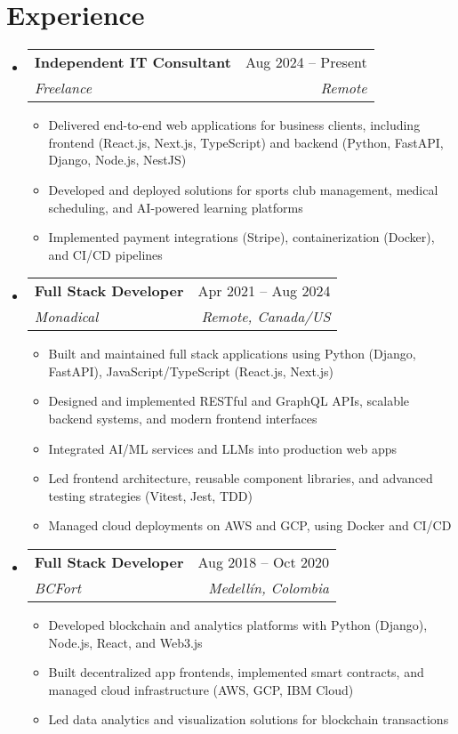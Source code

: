 \documentclass[letterpaper,11pt]{article}
\makeatletter
\newcommand{\resumeSubheading}[4]{
  \vspace{-2pt}
  \item[]
  \begin{tabular*}{\textwidth}{@{\extracolsep{\fill}}l r}
    \textbf{#1} & #2 \\
    \textit{#3} & \textit{#4} \\
  \end{tabular*}
  \vspace{-5pt}
}
\makeatother
\begin{document}
\section{Experience}
\begin{itemize}[leftmargin=0pt, itemindent=0pt, label={}, itemsep=1pt]
\resumeSubheading
{Independent IT Consultant}{Aug 2024 -- Present}
{Freelance}{Remote}
\begin{itemize}[leftmargin=*, itemsep=0pt]
    \item Delivered end-to-end web applications for business clients, including frontend (React.js, Next.js, TypeScript) and backend (Python, FastAPI, Django, Node.js, NestJS)
    \item Developed and deployed solutions for sports club management, medical scheduling, and AI-powered learning platforms
    \item Implemented payment integrations (Stripe), containerization (Docker), and CI/CD pipelines
\end{itemize}

\resumeSubheading
{Full Stack Developer}{Apr 2021 -- Aug 2024}
{Monadical}{Remote, Canada/US}
\begin{itemize}[leftmargin=*, itemsep=0pt]
    \item Built and maintained full stack applications using Python (Django, FastAPI), JavaScript/TypeScript (React.js, Next.js)
    \item Designed and implemented RESTful and GraphQL APIs, scalable backend systems, and modern frontend interfaces
    \item Integrated AI/ML services and LLMs into production web apps
    \item Led frontend architecture, reusable component libraries, and advanced testing strategies (Vitest, Jest, TDD)
    \item Managed cloud deployments on AWS and GCP, using Docker and CI/CD
\end{itemize}

\resumeSubheading
{Full Stack Developer}{Aug 2018 -- Oct 2020}
{BCFort}{Medellín, Colombia}
\begin{itemize}[leftmargin=*, itemsep=0pt]
    \item Developed blockchain and analytics platforms with Python (Django), Node.js, React, and Web3.js
    \item Built decentralized app frontends, implemented smart contracts, and managed cloud infrastructure (AWS, GCP, IBM Cloud)
    \item Led data analytics and visualization solutions for blockchain transactions
\end{itemize}


\end{itemize}
\end{document}
